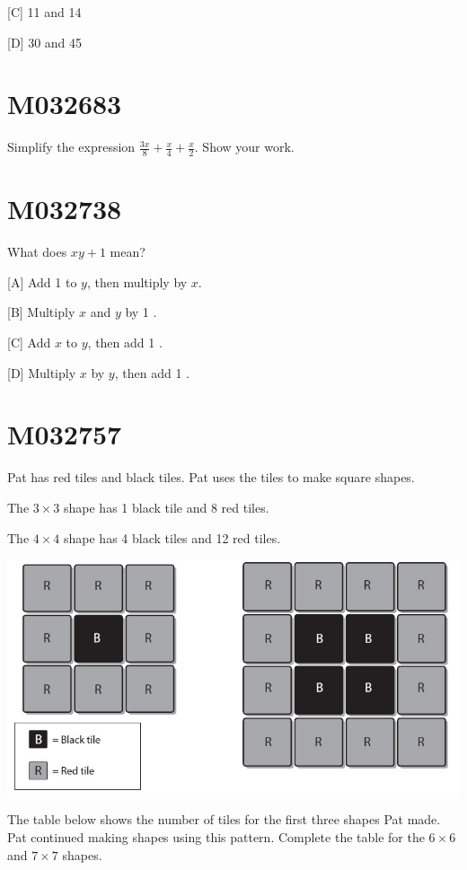 \documentclass[12pt]{article}
\begin{document}
[C] 11 and 14

[D] 30 and 45

\newpage
\section*{M032683}

Simplify the expression $\frac{3 x}{8}+\frac{x}{4}+\frac{x}{2}$. Show your work.

\newpage
\section*{M032738}

What does $x y+1$ mean?

[A] Add 1 to $y$, then multiply by $x$.

[B] Multiply $x$ and $y$ by 1 .

[C] Add $x$ to $y$, then add 1 .

[D] Multiply $x$ by $y$, then add 1 .

\newpage
\section*{M032757}

Pat has red tiles and black tiles. Pat uses the tiles to make square shapes.

The $3 \times 3$ shape has 1 black tile and 8 red tiles.

The $4 \times 4$ shape has 4 black tiles and 12 red tiles.

\includegraphics[max width=\textwidth]{2024_02_20_828ebc9d68bcc1fbb223g-31}

The table below shows the number of tiles for the first three shapes Pat made. Pat continued making shapes using this pattern. Complete the table for the $6 \times 6$ and $7 \times 7$ shapes.
\end{document}
